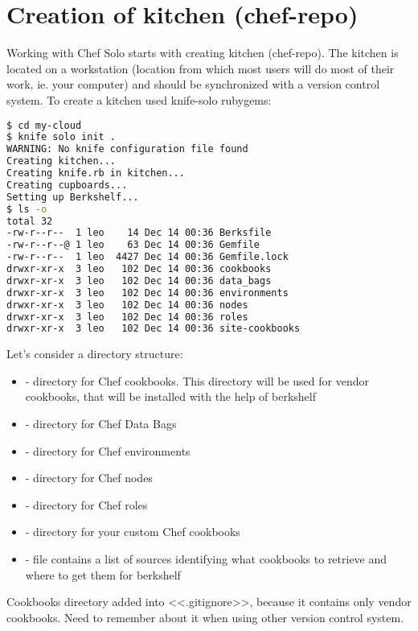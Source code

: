 \section{Creation of kitchen (chef-repo)}

Working with Chef Solo starts with creating kitchen (chef-repo). The kitchen is located on a workstation (location from which most users will do most of their work, ie. your computer) and should be synchronized with a version control system. To create a kitchen used knife-solo rubygems:

\begin{lstlisting}[language=Bash,label=lst:my-cloud-kitchen1,title=my-cloud]
$ cd my-cloud
$ knife solo init .
WARNING: No knife configuration file found
Creating kitchen...
Creating knife.rb in kitchen...
Creating cupboards...
Setting up Berkshelf...
$ ls -o
total 32
-rw-r--r--  1 leo    14 Dec 14 00:36 Berksfile
-rw-r--r--@ 1 leo    63 Dec 14 00:36 Gemfile
-rw-r--r--  1 leo  4427 Dec 14 00:36 Gemfile.lock
drwxr-xr-x  3 leo   102 Dec 14 00:36 cookbooks
drwxr-xr-x  3 leo   102 Dec 14 00:36 data_bags
drwxr-xr-x  3 leo   102 Dec 14 00:36 environments
drwxr-xr-x  3 leo   102 Dec 14 00:36 nodes
drwxr-xr-x  3 leo   102 Dec 14 00:36 roles
drwxr-xr-x  3 leo   102 Dec 14 00:36 site-cookbooks
\end{lstlisting}

Let's consider a directory structure:

\begin{itemize}
  \item {} - directory for Chef cookbooks. This directory will be used for vendor cookbooks, that will be installed with the help of berkshelf
  \item {} - directory for Chef Data Bags
  \item {} - directory for Chef environments
  \item {} - directory for Chef nodes
  \item {} - directory for Chef roles
  \item {} - directory for your custom Chef cookbooks
  \item {} - file contains a list of sources identifying what cookbooks to retrieve and where to get them for berkshelf
\end{itemize}

Cookbooks directory added into <<.gitignore>>, because it contains only vendor cookbooks. Need to remember about it when using other version control system.
